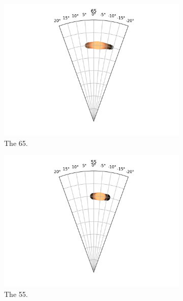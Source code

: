 \documentclass{kththesis}
\begin{document}
\begin{figure}
    \centering
    \begin{subfigure}{0.4\textwidth}
    \centering
    \includegraphics[width=\textwidth]{AgentDirectionChoices/MPDQN_Ullna_Direction_Choices_65.png} 
    \caption{The 65.}
    \label{fig:65_ullna_deviation}
    \end{subfigure}
    \begin{subfigure}{0.4\textwidth}
    \centering
    \includegraphics[width=\textwidth]{AgentDirectionChoices/MPDQN_Ullna_Direction_Choices_55.png} 
    \caption{The 55.}
    \label{fig:55_ullna_deviation}
    \end{subfigure}
    \begin{subfigure}{0.4\textwidth}

\end{subfigure}
\end{figure}
\end{document}
